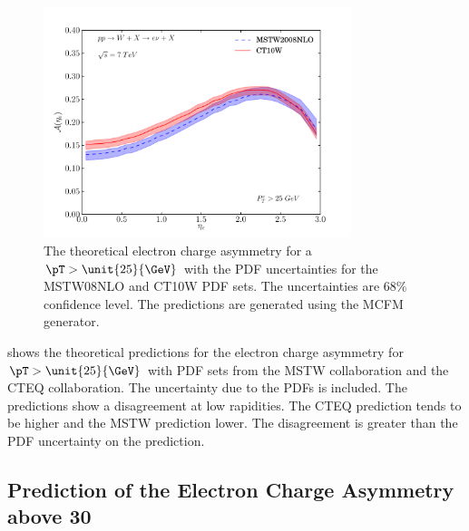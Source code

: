 \begin{figure}[htbp]
  \centering
  \includegraphics[width=0.8\textwidth]{asym-uncert}
  \caption[The theoretical electron charge asymmetry for a ${\pT>\unit{25}{\GeV}}$
with the {PDF} uncertainties.] {The theoretical electron charge
asymmetry\cite{monchenault2011predictions} for a $\pT>\unit{25}{\GeV}$ with the
{PDF} uncertainties for the MSTW08NLO\cite{martin2009parton} and
CT10W\cite{lai2010vv} {PDF} sets. The uncertainties are $68\%$ confidence level. The
predictions are generated using the {MCFM} \cite{campbellmcfm} generator.}
  \label{fig:asym-uncert}
\end{figure}

 shows the theoretical predictions for the electron
charge asymmetry for $\pT>\unit{25}{\GeV}$ with PDF sets from the MSTW
collaboration\cite{martin2009parton} and the CTEQ collaboration\cite{lai2010vv}.
The uncertainty due to the PDFs is included.  The predictions show a
disagreement at low rapidities. The CTEQ prediction tends to be higher and the
MSTW prediction lower. The disagreement is greater than the PDF uncertainty on
the prediction.

\subsection{Prediction of the Electron Charge Asymmetry above \unit{30}{\GeV}}

